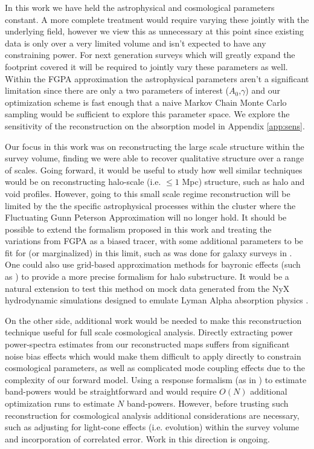 \documentclass[usenatbib,onecolumn]{mnras}
\begin{document}
In this work we have held the astrophysical and cosmological parameters constant. A more complete treatment would require varying these jointly with the underlying field, however we view this as unnecessary at this point since existing data is only over a very limited volume and isn't expected to have any constraining power. For next generation surveys which will greatly expand the footprint covered it will be required to jointly vary these parameters as well. Within the FGPA approximation the astrophysical parameters aren't a significant limitation since there are only a two parameters of interest ($A_0$,$\gamma$) and our optimization scheme is fast enough that a naive Markov Chain Monte Carlo sampling would be sufficient to explore this parameter space. We explore the sensitivity of the reconstruction on the absorption model in Appendix \ref{app:sens}.

Our focus in this work was on reconstructing the large scale structure within the survey volume, finding we were able to recover qualitative structure over a range of scales. Going forward, it would be useful to study how well similar techniques would be on reconstructing halo-scale (i.e.  $\leq 1$ Mpc) structure, such as halo and void profiles. However, going to this small scale regime reconstruction will be limited by the the specific astrophysical processes within the cluster where the Fluctuating Gunn Peterson Approximation will no longer hold. It should be possible to extend the formalism proposed in this work and treating the variations from FGPA as a biased tracer, with some additional parameters to be fit for (or marginalized) in this limit, such as was done for galaxy surveys in \cite{2015ata,2016Kitaura,2018BORG}. One could also use grid-based approximation methods for bayronic effects (such as \cite{2018Dai}) to provide a more precise formalism for halo substructure. It would be a natural extension to test this method on mock data generated from the NyX hydrodynamic simulations designed to emulate Lyman Alpha absorption physics \cite{2013nyx,2015nyxlya}.

On the other side, additional work would be needed to make this reconstruction technique useful for full scale cosmological analysis. Directly extracting power power-spectra estimates from our reconstructed maps suffers from significant noise bias effects which would make them difficult to apply directly to constrain cosmological parameters, as well as complicated mode coupling effects due to the complexity of our forward model. Using a response formalism (as in \cite{seljak2017towards,2018Horowitz,2018fengseljakzaldarriaga}) to estimate band-powers would be straightforward and would require $O(N)$ additional optimization runs to estimate $N$ band-powers. However, before trusting such reconstruction for cosmological analysis additional considerations are necessary, such as adjusting for light-cone effects (i.e. evolution) within the survey volume and incorporation of correlated error. Work in this direction is ongoing.
\end{document}
